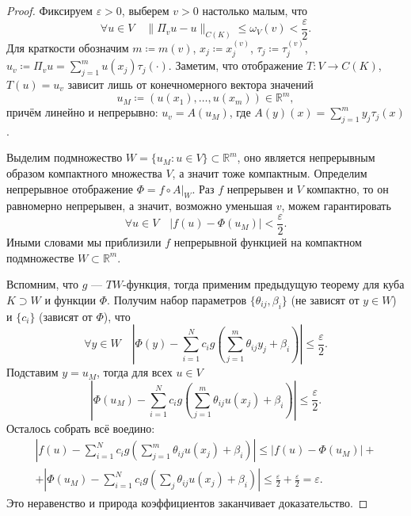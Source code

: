 \documentclass[../NDCNNAI_main.tex]{subfiles}
\begin{document}
\begin{proof}
  Фиксируем $\varepsilon > 0$, выберем $v > 0$ настолько малым, что
  $$\forall u \in V \quad \|\Pi_v u - u\|_{C(K)} \le \omega_V (v) < \frac{\varepsilon}{2}.$$
  Для краткости обозначим $m \coloneq m(v)$, $x_j \coloneq x_j^{(v)}$, $\tau_j \coloneq \tau_j^{(v)}$, $u_v \coloneq \Pi_v u = \sum_{j=1}^m u(x_j) \tau_j(\cdot)$.
  Заметим, что отображение $T\colon V \to C(K)$, $T(u) = u_v$ зависит лишь от конечномерного вектора значений
  $$u_M \coloneq \left(u(x_1), \dots, u(x_m)\right) \in \mathbb{R}^m,$$
  причём линейно и непрерывно: $u_v = A(u_M)$, где $A(y)(x) = \sum_{j=1}^m y_j \tau_j(x)$.

  Выделим подмножество $W = \{u_M : u \in V\} \subset \mathbb{R}^m$, оно является непрерывным образом компактного множества $V$, а значит тоже компактным.
  Определим непрерывное отображение $\Phi = f \circ A \big|_W$.
  Раз $f$ непрерывен и $V$ компактно, то он равномерно непрерывен, а значит, возможно уменьшая $v$, можем гарантировать
  $$\forall u \in V \quad |f(u) - \Phi(u_M)| < \frac{\varepsilon}{2}.$$
  Иными словами мы приблизили $f$ непрерывной функцией на компактном подмножестве $W \subset \mathbb{R}^m$.

  Вспомним, что $g$ --- $TW$-функция, тогда применим предыдущую теорему для куба $K \supset W$ и функции $\Phi$.
  Получим набор параметров $\{\theta_{ij}, \beta_i\}$ (не зависят от $y \in W$) и $\{c_i\}$ (зависят от $\Phi$), что
  $$\forall y \in W \quad \left|\Phi(y) - \sum_{i=1}^{N} c_i g\left(\sum_{j=1}^{m} \theta_{ij} y_j + \beta_i\right)\right| \le \frac{\varepsilon}{2}.$$
  Подставим $y = u_M$, тогда для всех $u \in V$
  $$\left|\Phi(u_M) - \sum_{i=1}^{N} c_i g\left(\sum_{j=1}^{m} \theta_{ij} u(x_j) + \beta_i\right)\right| \le \frac{\varepsilon}{2}.$$
  Осталось собрать всё воедино:
  \begin{multline*}
    \left|f(u) - \sum_{i=1}^{N} c_i g\left(\sum_{j=1}^{m} \theta_{ij} u(x_j) + \beta_i\right)\right| \le |f(u) - \Phi(u_M)| + \\
    + \left|\Phi(u_M) - \sum_{i=1}^{N} c_i g\left(\sum_{j} \theta_{ij} u(x_j) + \beta_i\right)\right| \le \frac{\varepsilon}{2} + \frac{\varepsilon}{2} = \varepsilon.
  \end{multline*}
  Это неравенство и природа коэффициентов заканчивает доказательство.
\end{proof}
\end{document}
